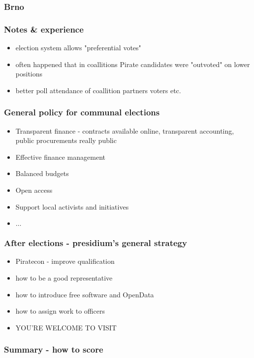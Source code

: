 \begin{frame}
	\frametitle{Brno}
\end{frame}
\begin{frame}
	\frametitle{Notes \& experience}
	\begin{itemize}
		\item election system allows "preferential votes"
		\item often happened that in coallitions Pirate candidates were "outvoted" on lower positions
		\item better poll attendance of coallition partners voters etc.
	\end{itemize}
\end{frame}
\begin{frame}
	\frametitle{General policy for communal elections}
	\begin{itemize}
		\item Transparent finance - contracts available online, transparent accounting, public procurements really public
		\item Effective finance management
		\item Balanced budgets
		\item Open access
		\item Support local activists and initiatives
		\item $\dots$ %
	\end{itemize}
\end{frame}
\begin{frame}
	\frametitle{After elections - presidium's general strategy}
	\begin{itemize}
		\item Piratecon - improve qualification
		\item how to be a good representative
		\item how to introduce free software and OpenData
		\item how to assign work to officers
		\item YOU'RE WELCOME TO VISIT
	\end{itemize}
\end{frame}
\begin{frame}
	\frametitle{Summary - how to score}
\end{frame}